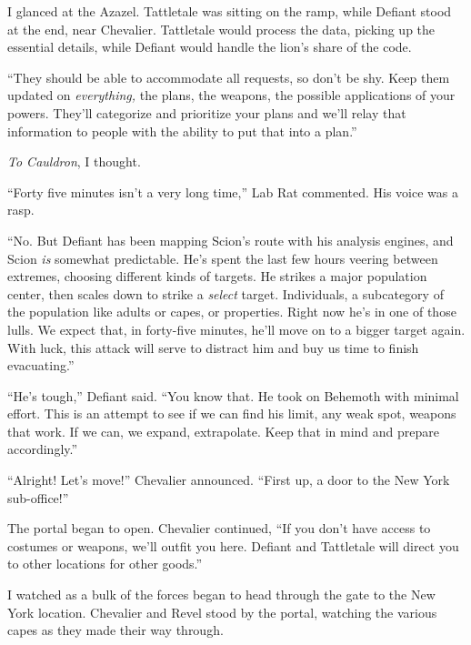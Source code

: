 I glanced at the Azazel.  Tattletale was sitting on the ramp, while Defiant stood at the end, near Chevalier.  Tattletale would process the data, picking up the essential details, while Defiant would handle the lion's share of the code.



``They should be able to accommodate all requests, so don't be shy.  Keep them updated on \emph{everything, }the plans, the weapons, the possible applications of your powers.  They'll categorize and prioritize your plans and we'll relay that information to people with the ability to put that into a plan.''



\emph{To Cauldron}, I thought.



``Forty five minutes isn't a very long time,'' Lab Rat commented.  His voice was a rasp.



``No.  But Defiant has been mapping Scion's route with his analysis engines, and Scion \emph{is} somewhat predictable.  He's spent the last few hours veering between extremes, choosing different kinds of targets.  He strikes a major population center, then scales down to strike a \emph{select} target.  Individuals, a subcategory of the population like adults or capes, or properties.  Right now he's in one of those lulls.  We expect that, in forty-five minutes, he'll move on to a bigger target again.  With luck, this attack will serve to distract him and buy us time to finish evacuating.''



``He's tough,'' Defiant said.  ``You know that.  He took on Behemoth with minimal effort.  This is an attempt to see if we can find his limit, any weak spot, weapons that work.  If we can, we expand, extrapolate.  Keep that in mind and prepare accordingly.''



``Alright!  Let's move!'' Chevalier announced.  ``First up, a door to the New York sub-office!''



The portal began to open.  Chevalier continued, ``If you don't have access to costumes or weapons, we'll outfit you here.  Defiant and Tattletale will direct you to other locations for other goods.''



I watched as a bulk of the forces began to head through the gate to the New York location.  Chevalier and Revel stood by the portal, watching the various capes as they made their way through.




